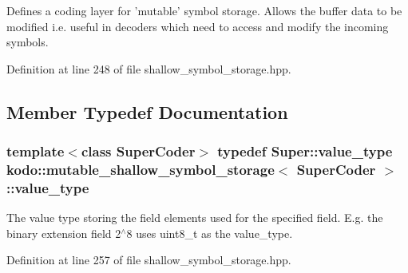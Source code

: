 Defines a coding layer for 'mutable' symbol storage. Allows the buffer data to be modified i.\-e. useful in decoders which need to access and modify the incoming symbols. 

Definition at line 248 of file shallow\-\_\-symbol\-\_\-storage.\-hpp.



\subsection{Member Typedef Documentation}
\hypertarget{classkodo_1_1mutable__shallow__symbol__storage_a9ff10d29f7c81440e2e73cbcdff94d46}{
\subsubsection[{value\-\_\-type}]{\setlength{\rightskip}{0pt plus 5cm}template$<$class Super\-Coder$>$ typedef {\bf Super\-::value\-\_\-type} {\bf kodo\-::mutable\-\_\-shallow\-\_\-symbol\-\_\-storage}$<$ Super\-Coder $>$\-::{\bf value\-\_\-type}}}\label{classkodo_1_1mutable__shallow__symbol__storage_a9ff10d29f7c81440e2e73cbcdff94d46}




The value type storing the field elements used for the specified field. E.\-g. the binary extension field 2$^\wedge$8 uses uint8\-\_\-t as the value\-\_\-type. 

Definition at line 257 of file shallow\-\_\-symbol\-\_\-storage.\-hpp.



